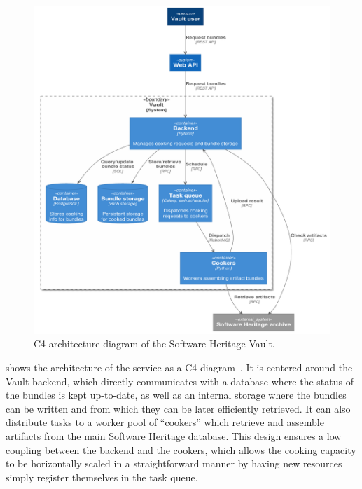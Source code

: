 %     

\begin{figure}
  \centering
  \includegraphics[width=\linewidth]{img/vault/arch-container}
  \caption{C4 architecture diagram of the Software Heritage Vault.}%
  \label{fig:vault-arch}
\end{figure}

 shows the architecture of the service as a C4
diagram~\cite{brown2018c4}. It is centered
around the Vault backend, which directly communicates with a database where the
status of the bundles is kept up-to-date, as well as an internal storage where
the bundles can be written and from which they can be later efficiently
retrieved. It can also distribute tasks to a worker pool of ``cookers'' which
retrieve and assemble artifacts from the main Software Heritage database.  This
design ensures a low coupling between the backend and the cookers, which allows
the cooking capacity to be horizontally scaled in a straightforward manner by
having new resources simply register themselves in the task queue.

